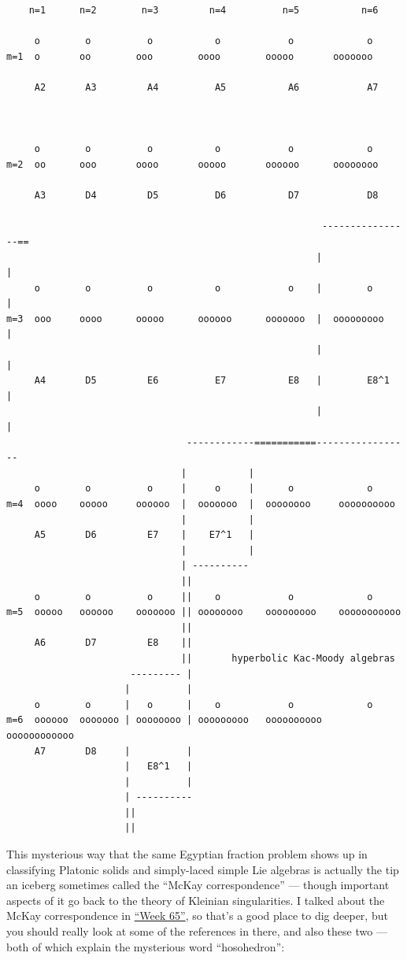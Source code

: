 \documentclass{article}
\begin{document}
\begin{verbatim}
    n=1      n=2        n=3         n=4          n=5           n=6

     o        o          o           o            o             o   
m=1  o       oo        ooo        oooo        ooooo       ooooooo
    
     A2       A3         A4          A5           A6            A7



     o        o          o           o            o             o   
m=2  oo      ooo       oooo       ooooo       oooooo      oooooooo

     A3       D4         D5          D6           D7            D8

                                                        ----------------==
                                                       |               |
     o        o          o           o            o    |        o      |
m=3  ooo     oooo      ooooo      oooooo      ooooooo  |  ooooooooo    |
                                                       |               |
     A4       D5         E6          E7           E8   |        E8^1   |
                                                       |               |
                                ------------===========-----------------
                               |           |
     o        o          o     |     o     |      o             o   
m=4  oooo    ooooo     oooooo  |  ooooooo  |  oooooooo     oooooooooo
                               |           |
     A5       D6         E7    |    E7^1   |       
                               |           |
                               | ----------
                               ||
     o        o          o     ||    o            o             o   
m=5  ooooo   oooooo    ooooooo || oooooooo    ooooooooo    ooooooooooo
                               ||
     A6       D7         E8    ||   
                               ||       hyperbolic Kac-Moody algebras
                      --------- |         
                     |          |
     o        o      |   o      |    o            o             o   
m=6  oooooo  ooooooo | oooooooo | ooooooooo   oooooooooo   oooooooooooo  
     A7       D8     |          |
                     |   E8^1   |
                     |          |
                     | ----------
                     ||
                     ||
\end{verbatim}

This mysterious way that the same Egyptian fraction problem shows up in
classifying Platonic solids and simply-laced simple Lie algebras is
actually the tip an iceberg sometimes called the ``McKay
correspondence'' --- though important aspects of it go back to the
theory of Kleinian singularities. I talked about the McKay
correspondence in \protect\hyperlink{week65}{``Week 65''}, so that's a
good place to dig deeper, but you should really look at some of the
references in there, and also these two --- both of which explain the
mysterious word ``hosohedron'':
\end{document}
